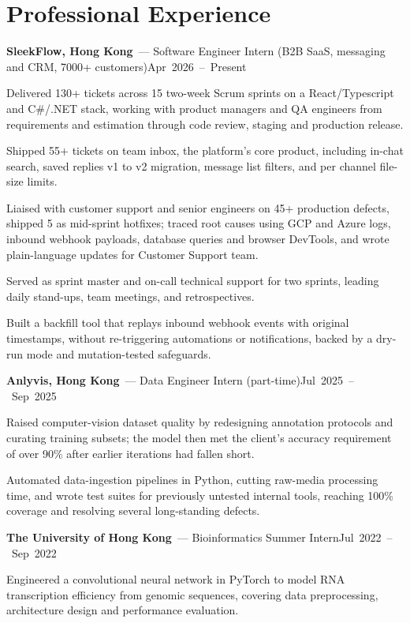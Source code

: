 \documentclass[10pt,a4paper]{article}
\newcommand{\entry}[3]{\vspace{4pt}\textbf{#1}\ #2\hfill\mbox{#3}\par\vspace{1pt}}
\begin{document}
\section{Professional Experience}

\entry{SleekFlow, Hong Kong}{--- Software Engineer Intern (B2B SaaS, messaging and CRM, 7000+ customers)}{Apr 2026 -- Present}
\begin{bul}
  \item Delivered 130+ tickets across 15 two-week Scrum sprints on a React/Typescript and C\#/.NET stack, working with product managers and QA engineers from requirements and estimation through code review, staging and production release.
  \item Shipped 55+ tickets on team inbox, the platform's core product, including in-chat search, saved replies v1 to v2 migration, message list filters, and per channel file-size limits.
  \item Liaised with customer support and senior engineers on 45+ production defects, shipped 5 as mid-sprint hotfixes; traced root causes using GCP and Azure logs, inbound webhook payloads, database queries and browser DevTools, and wrote plain-language updates for Customer Support team.
  \item Served as sprint master and on-call technical support for two sprints, leading daily stand-ups, team meetings, and retrospectives.
  \item Built a backfill tool that replays inbound webhook events with original timestamps, without re-triggering automations or notifications, backed by a dry-run mode and mutation-tested safeguards.
\end{bul}

\entry{Anlyvis, Hong Kong}{--- Data Engineer Intern (part-time)}{Jul 2025 -- Sep 2025}
\begin{bul}
  \item Raised computer-vision dataset quality by redesigning annotation protocols and curating training subsets; the model then met the client's accuracy requirement of over 90\% after earlier iterations had fallen short.
  \item Automated data-ingestion pipelines in Python, cutting raw-media processing time, and wrote test suites for previously untested internal tools, reaching 100\% coverage and resolving several long-standing defects.
\end{bul}

\entry{The University of Hong Kong}{--- Bioinformatics Summer Intern}{Jul 2022 -- Sep 2022}
\begin{bul}
  \item Engineered a convolutional neural network in PyTorch to model RNA transcription efficiency from genomic sequences, covering data preprocessing, architecture design and performance evaluation.
\end{bul}
\end{document}
